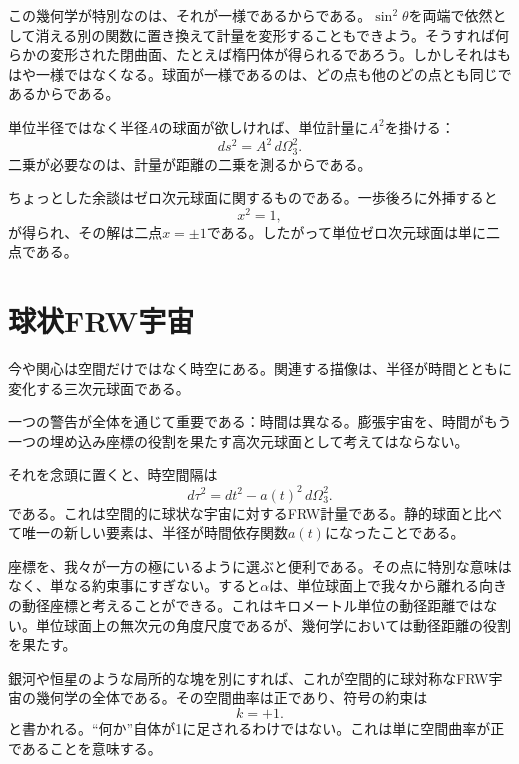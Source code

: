 この幾何学が特別なのは、それが一様であるからである。\(\sin^2\theta\)を両端で依然として消える別の関数に置き換えて計量を変形することもできよう。そうすれば何らかの変形された閉曲面、たとえば楕円体が得られるであろう。しかしそれはもはや一様ではなくなる。球面が一様であるのは、どの点も他のどの点とも同じであるからである。

単位半径ではなく半径\(A\)の球面が欲しければ、単位計量に\(A^2\)を掛ける：
\begin{equation}
ds^2=A^2\,d\Omega_3^2.
\end{equation}
二乗が必要なのは、計量が距離の二乗を測るからである。

ちょっとした余談はゼロ次元球面に関するものである。一歩後ろに外挿すると
\begin{equation}
x^2=1,
\end{equation}
が得られ、その解は二点\(x=\pm 1\)である。したがって単位ゼロ次元球面は単に二点である。

\section{球状FRW宇宙}

今や関心は空間だけではなく時空にある。関連する描像は、半径が時間とともに変化する三次元球面である。

一つの警告が全体を通じて重要である：時間は異なる。膨張宇宙を、時間がもう一つの埋め込み座標の役割を果たす高次元球面として考えてはならない。

それを念頭に置くと、時空間隔は
\begin{equation}
d\tau^2=dt^2-a(t)^2\,d\Omega_3^2.
\end{equation}
である。これは空間的に球状な宇宙に対するFRW計量である。静的球面と比べて唯一の新しい要素は、半径が時間依存関数\(a(t)\)になったことである。

座標を、我々が一方の極にいるように選ぶと便利である。その点に特別な意味はなく、単なる約束事にすぎない。すると\(\alpha\)は、単位球面上で我々から離れる向きの動径座標と考えることができる。これはキロメートル単位の動径距離ではない。単位球面上の無次元の角度尺度であるが、幾何学においては動径距離の役割を果たす。

銀河や恒星のような局所的な塊を別にすれば、これが空間的に球対称なFRW宇宙の幾何学の全体である。その空間曲率は正であり、符号の約束は
\begin{equation}
k=+1.
\end{equation}
と書かれる。``何か''自体が1に足されるわけではない。これは単に空間曲率が正であることを意味する。

